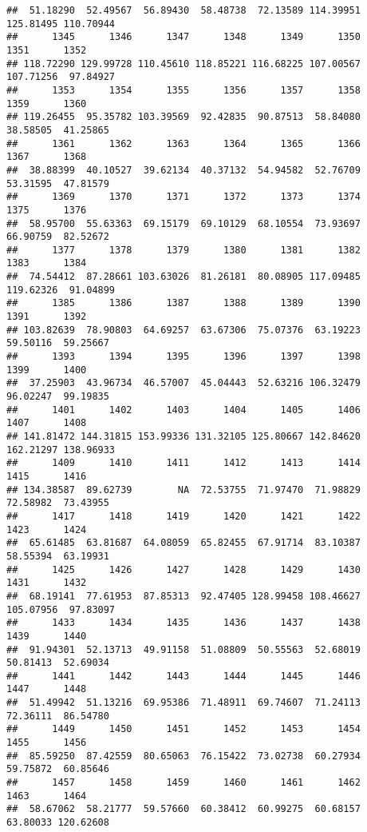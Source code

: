 \documentclass[
]{article}
\begin{document}
\begin{verbatim}
##  51.18290  52.49567  56.89430  58.48738  72.13589 114.39951 125.81495 110.70944 
##      1345      1346      1347      1348      1349      1350      1351      1352 
## 118.72290 129.99728 110.45610 118.85221 116.68225 107.00567 107.71256  97.84927 
##      1353      1354      1355      1356      1357      1358      1359      1360 
## 119.26455  95.35782 103.39569  92.42835  90.87513  58.84080  38.58505  41.25865 
##      1361      1362      1363      1364      1365      1366      1367      1368 
##  38.88399  40.10527  39.62134  40.37132  54.94582  52.76709  53.31595  47.81579 
##      1369      1370      1371      1372      1373      1374      1375      1376 
##  58.95700  55.63363  69.15179  69.10129  68.10554  73.93697  66.90759  82.52672 
##      1377      1378      1379      1380      1381      1382      1383      1384 
##  74.54412  87.28661 103.63026  81.26181  80.08905 117.09485 119.62326  91.04899 
##      1385      1386      1387      1388      1389      1390      1391      1392 
## 103.82639  78.90803  64.69257  63.67306  75.07376  63.19223  59.50116  59.25667 
##      1393      1394      1395      1396      1397      1398      1399      1400 
##  37.25903  43.96734  46.57007  45.04443  52.63216 106.32479  96.02247  99.19835 
##      1401      1402      1403      1404      1405      1406      1407      1408 
## 141.81472 144.31815 153.99336 131.32105 125.80667 142.84620 162.21297 138.96933 
##      1409      1410      1411      1412      1413      1414      1415      1416 
## 134.38587  89.62739        NA  72.53755  71.97470  71.98829  72.58982  73.43955 
##      1417      1418      1419      1420      1421      1422      1423      1424 
##  65.61485  63.81687  64.08059  65.82455  67.91714  83.10387  58.55394  63.19931 
##      1425      1426      1427      1428      1429      1430      1431      1432 
##  68.19141  77.61953  87.85313  92.47405 128.99458 108.46627 105.07956  97.83097 
##      1433      1434      1435      1436      1437      1438      1439      1440 
##  91.94301  52.13713  49.91158  51.08809  50.55563  52.68019  50.81413  52.69034 
##      1441      1442      1443      1444      1445      1446      1447      1448 
##  51.49942  51.13216  69.95386  71.48911  69.74607  71.24113  72.36111  86.54780 
##      1449      1450      1451      1452      1453      1454      1455      1456 
##  85.59250  87.42559  80.65063  76.15422  73.02738  60.27934  59.75872  60.85646 
##      1457      1458      1459      1460      1461      1462      1463      1464 
##  58.67062  58.21777  59.57660  60.38412  60.99275  60.68157  63.80033 120.62608 

\end{verbatim}
\end{document}
